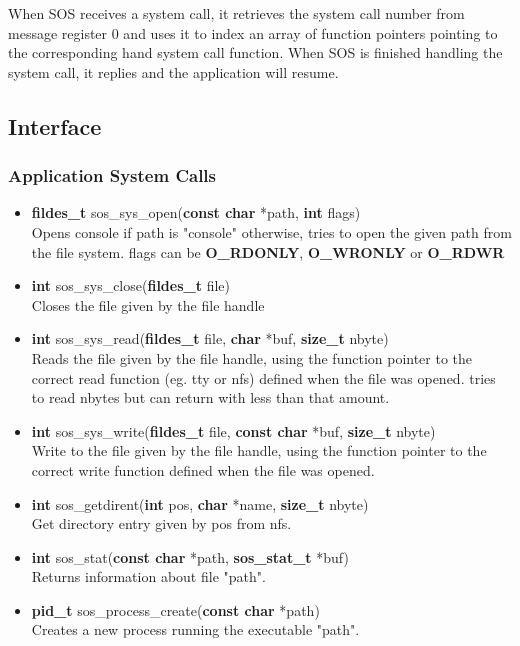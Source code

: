 \documentclass[12pt]{article}
\begin{document}
When SOS receives a system call, it retrieves the system call number from message register 0 and uses it to index an array of function pointers pointing to the corresponding hand system call function. When SOS is finished handling the system call, it replies and the application will resume.
\subsection{Interface}
\subsubsection{Application System Calls}
\begin{itemize}
\item \textbf{fildes\_t} sos\_sys\_open(\textbf{const char} *path, \textbf{int} flags)\\
Opens console if path is "console" otherwise, tries to open the given path from the file system.
flags can be \textbf{O\_RDONLY}, \textbf{O\_WRONLY} or \textbf{O\_RDWR}
\item \textbf{int} sos\_sys\_close(\textbf{fildes\_t} file)\\
Closes the file given by the file handle
\item \textbf{int} sos\_sys\_read(\textbf{fildes\_t} file, \textbf{char} *buf, \textbf{size\_t} nbyte)\\
Reads the file given by the file handle, using the function pointer to the correct read function (eg. tty or nfs) defined when the file was opened. tries to read nbytes but can return with less than that amount.
\item \textbf{int} sos\_sys\_write(\textbf{fildes\_t} file, \textbf{const char} *buf, \textbf{size\_t} nbyte)\\
Write to the file given by the file handle, using the function pointer to the correct write function defined when the file was opened.
\item \textbf{int} sos\_getdirent(\textbf{int} pos, \textbf{char} *name, \textbf{size\_t} nbyte)\\
Get directory entry given by pos from nfs.
\item \textbf{int} sos\_stat(\textbf{const char} *path, \textbf{sos\_stat\_t} *buf)\\
Returns information about file "path".
\item \textbf{pid\_t} sos\_process\_create(\textbf{const char} *path)\\
Creates a new process running the executable "path".

\end{itemize}
\end{document}
